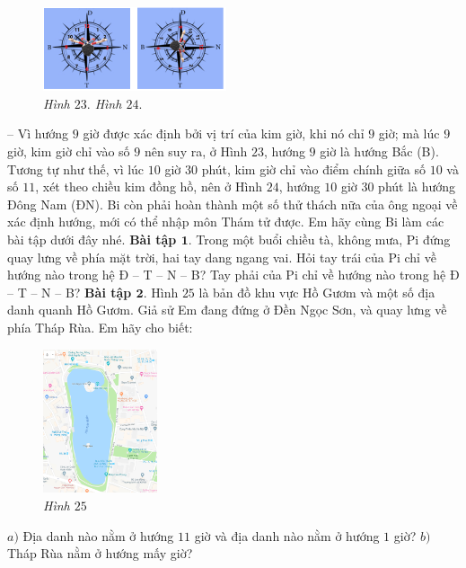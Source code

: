 	\begin{figure}[H]
		\centering
		\vspace*{-5pt}
		\captionsetup{labelformat= empty, justification=centering}
		\includegraphics[width=0.48\textwidth]{pic19}
		\caption{\small\textit{Hình $23.$ \hspace*{80pt} Hình $24.$}}
		\vspace*{-15pt}
	\end{figure}
	-- Vì hướng $9$ giờ được xác định bởi vị trí của kim giờ, khi nó chỉ $9$ giờ; mà lúc $9$ giờ, kim giờ chỉ vào số $9$ nên suy ra, ở Hình $23$, hướng $9$ giờ là hướng Bắc (B). Tương tự như thế, vì lúc $10$ giờ $30$ phút, kim giờ chỉ vào điểm chính giữa số $10$ và số $11$, xét theo chiều kim đồng hồ, nên ở Hình $24$, hướng $10$ giờ $30$ phút là hướng Đông Nam (ĐN).
	\vskip 0.1cm
	Bi còn phải hoàn thành một số thử thách nữa của ông ngoại về xác định hướng, mới có thể nhập môn Thám tử được. Em hãy cùng Bi làm các bài tập dưới đây nhé.
	\vskip 0.1cm
	\textbf{Bài tập $\pmb1.$} Trong một buổi chiều tà, không mưa, Pi đứng quay lưng về phía mặt trời, hai tay dang ngang vai. Hỏi tay trái của Pi chỉ về hướng nào trong hệ Đ -- T -- N -- B? Tay phải của Pi chỉ về hướng nào trong hệ Đ -- T -- N -- B?
	\vskip 0.1cm
	\textbf{Bài tập $\pmb2.$} Hình $25$ là bản đồ khu vực Hồ Gươm và một số địa danh quanh Hồ Gươm. Giả sử Em đang đứng ở Đền Ngọc Sơn, và quay lưng về phía Tháp Rùa. Em hãy cho biết:
	\begin{figure}[H]
		\centering
		\vspace*{-5pt}
		\captionsetup{labelformat= empty, justification=centering}
		\includegraphics[width=0.3\textwidth]{pic25}
		\caption{\small\textit{Hình $25$}}
		\vspace*{-5pt}
	\end{figure}
	$a)$ Địa danh nào nằm ở hướng $11$ giờ và địa danh nào nằm ở hướng $1$ giờ?
	\vskip 0.1cm
	$b)$ Tháp Rùa nằm ở hướng mấy giờ?